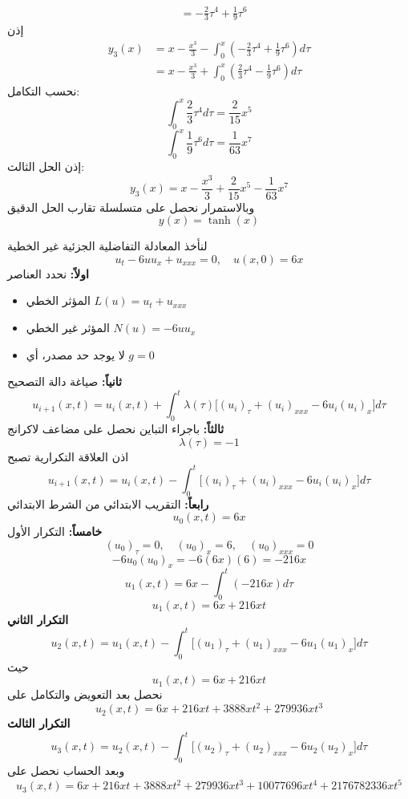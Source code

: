\begin{example}
\begin{align*}
	&= -\frac{2}{3}\tau^4+\frac{1}{9}\tau^6
\end{align*}
إذن
\begin{align*}
	y_3(x)
	&= x-\frac{x^3}{3}
	- \int_{0}^{x}
	\left(
	-\frac{2}{3}\tau^4+\frac{1}{9}\tau^6
	\right)d\tau \\
	&= x-\frac{x^3}{3}
	+\int_{0}^{x}
	\left(
	\frac{2}{3}\tau^4-\frac{1}{9}\tau^6
	\right)d\tau
\end{align*}
نحسب التكامل:
\[
\int_{0}^{x}\frac{2}{3}\tau^4 d\tau=\frac{2}{15}x^5
\]
\[
\int_{0}^{x}\frac{1}{9}\tau^6 d\tau=\frac{1}{63}x^7
\]
إذن الحل الثالث:
\[
y_3(x)
=
x-\frac{x^3}{3}
+\frac{2}{15}x^5
-\frac{1}{63}x^7
\]
	وبالاستمرار نحصل على متسلسلة تقارب الحل الدقيق
	\[
	y(x) = \tanh(x)
	\]
\end{example}

\begin{example}
	لنأخذ المعادلة التفاضلية الجزئية غير الخطية
	\[
	u_t - 6u u_x + u_{xxx} = 0, \quad u(x,0)=6x
	\]
	\textbf{اولاً:} نحدد العناصر
	\begin{itemize}
		\item المؤثر الخطي $L(u)=u_t+u_{xxx}$
		\item المؤثر غير الخطي $N(u)=-6u u_x$
		\item لا يوجد حد مصدر، أي $g=0$
	\end{itemize}
	\textbf{ثانياً:} صياغة دالة التصحيح
	\[
	u_{i+1}(x,t)=u_i(x,t)+\int_{0}^{t}\lambda(\tau)\Big[(u_i)_{\tau}+(u_i)_{xxx}-6u_i (u_i)_x\Big]d\tau
	\]
	\textbf{ثالثاً:} باجراء التباين نحصل على مضاعف لاكرانج
	\[
	\lambda(\tau)=-1
	\]
	اذن العلاقة التكرارية تصبح
	\[
	u_{i+1}(x,t)=u_i(x,t)-\int_{0}^{t}\Big[(u_i)_{\tau}+(u_i)_{xxx}-6u_i (u_i)_x\Big]d\tau
	\]
	\textbf{رابعاً:} التقريب الابتدائي من الشرط الابتدائي
	\[
	u_0(x,t)=6x
	\]
	\textbf{خامساً:} التكرار الأول
	\[
	(u_0)_{\tau}=0,\quad (u_0)_x=6,\quad (u_0)_{xxx}=0
	\]
	\[
	-6u_0 (u_0)_x=-6(6x)(6)=-216x
	\]
	\[
	u_1(x,t)=6x-\int_{0}^{t}(-216x)d\tau
	\]
	\[
	u_1(x,t)=6x+216xt
	\]
	\textbf{التكرار الثاني}
	\[
	u_2(x,t)=u_1(x,t)-\int_{0}^{t}\Big[(u_1)_{\tau}+(u_1)_{xxx}-6u_1 (u_1)_x\Big]d\tau
	\]
	حيث
	\[
	u_1(x,t)=6x+216xt
	\]
	نحصل بعد التعويض والتكامل على
	\[
	u_2(x,t)=6x+216xt+3888xt^2+279936xt^3
	\]
	\textbf{التكرار الثالث}
	\[
	u_3(x,t)=u_2(x,t)-\int_{0}^{t}\Big[(u_2)_{\tau}+(u_2)_{xxx}-6u_2 (u_2)_x\Big]d\tau
	\]
	وبعد الحساب نحصل على
	\[
	u_3(x,t)=6x+216xt+3888xt^2+279936xt^3+10077696xt^4+2176782336xt^5
	\]
\end{example}